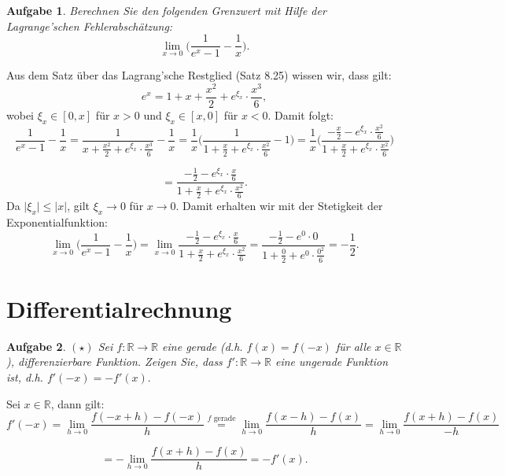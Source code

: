 \documentclass[a4paper, 20]{exam}
\newtheorem{ex}{Aufgabe}
\newcommand\RR{\mathbb{R}}
\begin{document}
\begin{ex} Berechnen Sie den folgenden Grenzwert mit Hilfe der Lagrange'schen Fehlerabschätzung: $$ \lim_{x \rightarrow 0} \bigg( \frac{1}{e^x-1} - \frac{1}{x} \bigg).$$
\end{ex}

\begin{solution}
Aus dem Satz \"uber das Lagrang'sche Restglied (Satz 8.25) wissen wir, dass gilt:
$$ e^x= 1 + x + \frac{x^2}{2} + e^{\xi_x} \cdot \frac{x^3}{6},$$
wobei $\xi_x \in [0,x]$ f\"ur $x>0$ und $\xi_x \in [x,0]$ f\"ur $x<0$. Damit folgt:
$$  \frac{1}{e^x-1} - \frac{1}{x} 
=  \frac{1}{x + \frac{x^2}{2} + e^{\xi_x} \cdot \frac{x^3}{6}} - \frac{1}{x} 
= \frac{1}{x} \bigg( \frac{1}{1 + \frac{x}{2} + e^{\xi_x} \cdot \frac{x^2}{6}} - 1 \bigg)
= \frac{1}{x} \bigg( \frac{-\frac{x}{2} - e^{\xi_x} \cdot \frac{x^2}{6}}{1 + \frac{x}{2} + e^{\xi_x} \cdot \frac{x^2}{6}} \bigg)$$

$$=  \frac{-\frac{1}{2} - e^{\xi_x} \cdot \frac{x}{6}}{1 + \frac{x}{2} + e^{\xi_x} \cdot \frac{x^2}{6}}.$$
Da $\vert \xi_x \vert\leq \vert x \vert$, gilt $\xi_x \longrightarrow 0$ f\"ur $x \longrightarrow 0$. Damit erhalten wir mit der Stetigkeit der Exponentialfunktion:
$$ \lim_{x \rightarrow 0} \bigg( \frac{1}{e^x-1} - \frac{1}{x} \bigg)
=   \lim_{x \rightarrow 0}  \frac{-\frac{1}{2} - e^{\xi_x} \cdot \frac{x}{6}}{1 + \frac{x}{2} + e^{\xi_x} \cdot \frac{x^2}{6}} 
=  \frac{-\frac{1}{2}- e^0\cdot 0}{1+ \frac{0}{2} + e^0\cdot \frac{0^2}{6} }
= -\frac{1}{2}.$$
\end{solution}

\newpage 



\section{Differentialrechnung}

\begin{ex}{$(\star)$}
Sei $f:\RR \longrightarrow \RR$ eine gerade (d.h. $f(x)=f(-x)$ f\"ur alle $x\in \RR$), differenzierbare Funktion. Zeigen Sie, dass $f':\RR \longrightarrow \RR$ eine ungerade Funktion ist, d.h. $f'(-x)=-f'(x).$
\end{ex}
\begin{solution}
Sei $x\in \RR$, dann gilt:
$$ f'(-x) = \lim_{h \rightarrow 0} \frac{f(-x+h)-f(-x)}{h} 
\stackrel{f \text{ gerade}}{=}\lim_{h \rightarrow 0} \frac{f(x-h)-f(x)}{h} 
= \lim_{h \rightarrow 0} \frac{f(x+h)-f(x)}{-h} $$

$$= - \lim_{h \rightarrow 0} \frac{f(x+h)-f(x)}{h} = -f'(x).$$
\end{solution}
\end{document}
